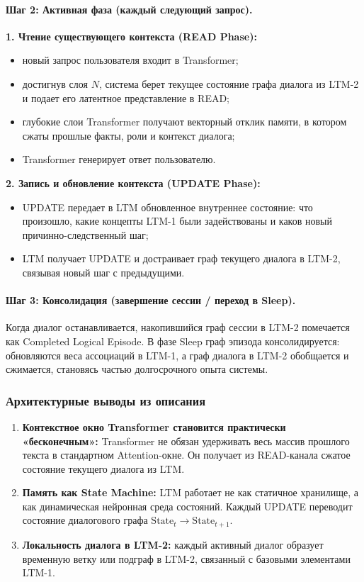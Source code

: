 \documentclass[11pt,a4paper]{article}
\begin{document}
\paragraph{Шаг 2: Активная фаза (каждый следующий запрос).}

\textbf{1. Чтение существующего контекста (READ Phase):}
\begin{itemize}
    \item новый запрос пользователя входит в Transformer;
    \item достигнув слоя $N$, система берет текущее состояние графа диалога из LTM-2 и подает его латентное представление в READ;
    \item глубокие слои Transformer получают векторный отклик памяти, в котором сжаты прошлые факты, роли и контекст диалога;
    \item Transformer генерирует ответ пользователю.
\end{itemize}

\textbf{2. Запись и обновление контекста (UPDATE Phase):}
\begin{itemize}
    \item UPDATE передает в LTM обновленное внутреннее состояние: что произошло, какие концепты LTM-1 были задействованы и каков новый причинно-следственный шаг;
    \item LTM получает UPDATE и достраивает граф текущего диалога в LTM-2, связывая новый шаг с предыдущими.
\end{itemize}

\paragraph{Шаг 3: Консолидация (завершение сессии / переход в Sleep).}
Когда диалог останавливается, накопившийся граф сессии в LTM-2 помечается как Completed Logical Episode. В фазе Sleep граф эпизода консолидируется: обновляются веса ассоциаций в LTM-1, а граф диалога в LTM-2 обобщается и сжимается, становясь частью долгосрочного опыта системы.

\subsubsection*{Архитектурные выводы из описания}

\begin{enumerate}
    \item \textbf{Контекстное окно Transformer становится практически «бесконечным»:} Transformer не обязан удерживать весь массив прошлого текста в стандартном Attention-окне. Он получает из READ-канала сжатое состояние текущего диалога из LTM.
    \item \textbf{Память как State Machine:} LTM работает не как статичное хранилище, а как динамическая нейронная среда состояний. Каждый UPDATE переводит состояние диалогового графа $\mathrm{State}_t \rightarrow \mathrm{State}_{t+1}$.
    \item \textbf{Локальность диалога в LTM-2:} каждый активный диалог образует временную ветку или подграф в LTM-2, связанный с базовыми элементами LTM-1.
\end{enumerate}
\end{document}
